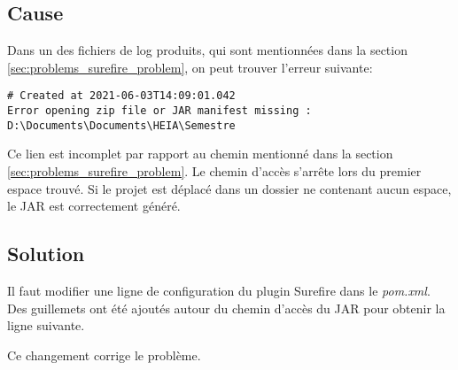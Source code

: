 \begin{minipage}{\linewidth}
\label{fig:problems_maven_skip_tests}
\end{minipage}

\subsection{Cause}

Dans un des fichiers de log produits, qui sont mentionnées dans la section \ref{sec:problems_surefire_problem}, on peut trouver l'erreur suivante:

\begin{verbatim}
# Created at 2021-06-03T14:09:01.042
Error opening zip file or JAR manifest missing : D:\Documents\Documents\HEIA\Semestre
\end{verbatim}

Ce lien est incomplet par rapport au chemin mentionné dans la section \ref{sec:problems_surefire_problem}. Le chemin d'accès s'arrête lors du premier espace trouvé. Si le projet est déplacé dans un dossier ne contenant aucun espace, le JAR est correctement généré.

\subsection{Solution}

Il faut modifier une ligne de configuration du plugin Surefire dans le \textit{pom.xml}. Des guillemets ont été ajoutés autour du chemin d'accès du JAR pour obtenir la ligne suivante.

Ce changement corrige le problème.